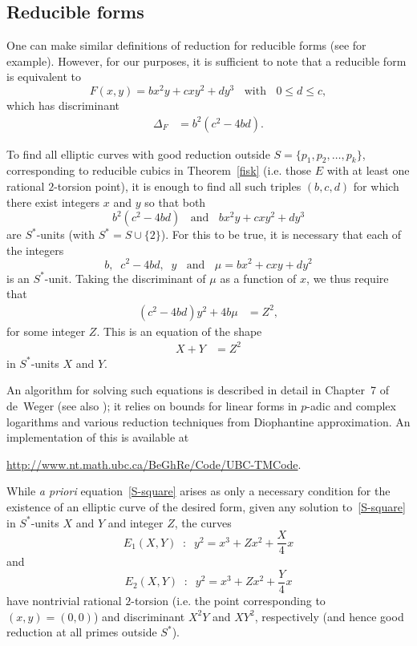 \subsection{Reducible forms} \label{ssec reducible}
One can make similar definitions of reduction for reducible forms (see \cite{BeGh} for example). However, for our 
purposes, it is sufficient to note that a reducible form is equivalent to 
$$
F(x,y) = b x^2 y + c x y^2 + d y^3 \; \; \mbox{ with }  \; \; 0 \leq d \leq c,
$$
which has discriminant
\begin{align*}
\Delta_F &= b^2 (c^2 - 4 b d).
\end{align*}

To find all elliptic curves with good reduction outside $S = \{ p_1, p_2, \ldots, p_k \}$, corresponding to 
reducible cubics in Theorem~\ref{fisk} (i.e. those $E$ with at least one rational $2$-torsion point), it is enough to find all such triples $(b,c,d)$ for which there exist integers $x$ and $y$ so that both
$$
b^2(c^2-4bd) \; \; \mbox{ and } \; \;  b x^2 y + c x y^2 + d y^3
$$
are $S^*$-units (with $S^* = S \cup \{ 2 \}$). For this to be true, it is necessary that each of the integers
$$
b, \;  \; c^2 - 4 bd,\;  \; y \; \; \mbox{ and } \; \;  \mu = bx^2 + cxy + dy^2
$$
is an $S^*$-unit. Taking the discriminant of $\mu$ as a function of $x$, we thus require that 
\begin{align} \label{weger}
(c^2 - 4 bd )  y^2  + 4 b \mu &=Z^2,
\end{align}
for some integer $Z$. This is an equation of the shape 
\begin{align} \label{S-square}
 X+Y &=Z^2
\end{align}
in $S^*$-units $X$ and $Y$. 

An algorithm for solving such equations is described in detail in Chapter~7 of de~Weger \cite{Weg0} (see also 
\cite{Weg}); it relies on bounds for linear forms in $p$-adic and complex logarithms and various reduction 
techniques from Diophantine approximation. An implementation of this is available at 
\begin{center}
\url{http://www.nt.math.ubc.ca/BeGhRe/Code/UBC-TMCode}.
\end{center}

While \emph{a priori} equation~\eqref{S-square} arises as only a necessary condition for the existence 
of an elliptic curve of the desired form, given any solution to~\eqref{S-square} in $S^*$-units $X$ and $Y$ and integer $Z$, the curves 
$$
E_1(X,Y) \; \; : \; \; y^2 = x^3 + Z x^2 + \frac{X}{4} x
$$
and
$$
E_2(X,Y) \; \; : \; \; y^2 = x^3 + Z x^2 + \frac{Y}{4} x
$$
have nontrivial rational $2$-torsion (i.e. the point corresponding to $(x,y)=(0,0)$) and discriminant $X^2Y$ and $XY^2$, respectively (and hence good reduction at all primes outside $S^*$). 

